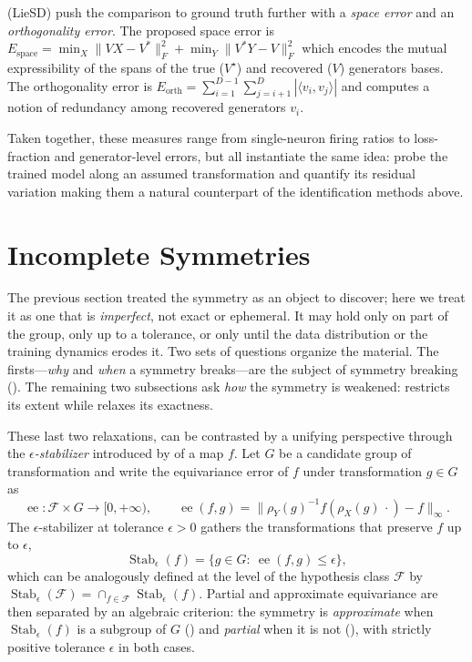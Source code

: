 \documentclass[mathematics,review,submit,moreauthors]{Definitions/mdpi}
\begin{document}
\citet{hu2025nn} (LieSD) push the comparison to ground truth further with a \emph{space error} and an \emph{orthogonality error}.
The proposed space error is $E_{\mathrm{space}} = \min_{X} \|VX - V^*\|_F^2 + \min_{Y} \|V^*Y - V\|_F^2$ which encodes the mutual expressibility of the spans of the true ($V^\star$) and recovered ($V$) generators bases.
The orthogonality error is $E_{\mathrm{orth}} = \sum_{i=1}^{D-1} \sum_{j=i+1}^{D} |\langle v_i, v_j \rangle|$ and computes a notion of redundancy among recovered generators $v_i$.

Taken together, these measures range from single-neuron firing ratios to loss-fraction and generator-level errors, but all instantiate the same idea: probe the trained model along an assumed transformation and quantify its residual variation making them a natural counterpart of the identification methods above.



\section{Incomplete Symmetries}\label{sec:incomplete-symmetries}

The previous section treated the symmetry as an object to discover; here we treat it as one that is \emph{imperfect}, not exact or ephemeral.
It may hold only on part of the group, only up to a tolerance, or only until the data distribution or the training dynamics erodes it.
Two sets of questions organize the material.
The firsts---\emph{why} and \emph{when} a symmetry breaks---are the subject of symmetry breaking ().
The remaining two subsections ask \emph{how} the symmetry is weakened:  restricts its extent while  relaxes its exactness.

These last two relaxations, can be contrasted by a unifying perspective through the \emph{$\epsilon$-stabilizer} introduced by \citet{petrache2023} of a map $f$.
Let $G$ be a candidate group of transformation and write the equivariance error of $f$ under transformation $g\in G$ as
$$\operatorname{ee}\colon\mathcal{F}\times G\to[0,+\infty),\qquad \operatorname{ee}(f,g)=\big\|\rho_Y(g)^{-1}f(\rho_X(g)\,\cdot)-f\big\|_\infty.$$
The $\epsilon$-stabilizer at tolerance $\epsilon>0$ gathers the transformations that preserve $f$ up to $\epsilon$,
$$\operatorname{Stab}_\epsilon(f)=\{g\in G:\ \operatorname{ee}(f,g)\le\epsilon\},$$
which can be analogously defined at the level of the hypothesis class $\mathcal{F}$ by $\operatorname{Stab}_\epsilon(\mathcal{F})=\cap_{f\in \mathcal{F}}\operatorname{Stab}_\epsilon(f)$.
Partial and approximate equivariance are then separated by an algebraic criterion: the symmetry is \emph{approximate} when $\operatorname{Stab}_\epsilon(f)$ is a subgroup of $G$ () and \emph{partial} when it is not (), with strictly positive tolerance $\epsilon$ in both cases.
\end{document}
